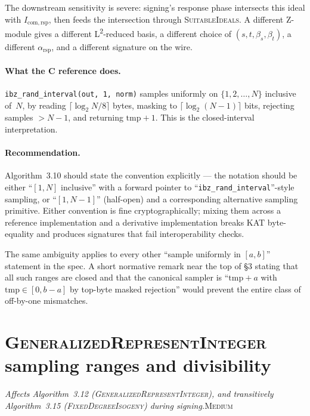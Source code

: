 \documentclass[a4paper,11pt]{article}
\newcommand{\algo}[1]{Algorithm~#1}
\newcommand{\medium}{\textsc{\color{RoyalBlue}Medium}}
\newcommand{\finding}[2]{\noindent\textit{#1}\hfill#2\par\smallskip}
\begin{document}
The downstream sensitivity is severe: signing's response phase
intersects this ideal with $I_{\mathrm{com,rsp}}$, then feeds
the intersection through \textsc{SuitableIdeals}.  A different
Z-module gives a different L\textsuperscript{2}-reduced basis,
a different choice of $(s, t, \beta_s, \beta_t)$, a different
$\alpha_\mathrm{rsp}$, and a different signature on the wire.

\paragraph{What the C reference does.}
\texttt{ibz\_rand\_interval(out, 1, norm)} samples uniformly on
$\{1, 2, \ldots, N\}$ inclusive of~$N$, by reading
$\lceil \log_2 N / 8 \rceil$ bytes, masking to
$\lceil \log_2(N{-}1) \rceil$ bits, rejecting samples
$> N{-}1$, and returning $\mathrm{tmp} + 1$.  This is the
closed-interval interpretation.

\paragraph{Recommendation.}
\algo{3.10} should state the convention explicitly --- the
notation should be either ``$[1, N]$ inclusive'' with a forward
pointer to ``\texttt{ibz\_rand\_interval}''-style sampling, or
``$[1, N-1]$'' (half-open) and a corresponding alternative
sampling primitive.  Either convention is fine cryptographically;
mixing them across a reference implementation and a derivative
implementation breaks KAT byte-equality and produces signatures
that fail interoperability checks.

The same ambiguity applies to every other ``sample uniformly
in $[a, b]$'' statement in the spec.  A short normative remark
near the top of \S3 stating that all such ranges are closed and
that the canonical sampler is ``$\mathrm{tmp} + a$ with
$\mathrm{tmp} \in [0, b{-}a]$ by top-byte masked rejection''
would prevent the entire class of off-by-one mismatches.

\section{\textsc{GeneralizedRepresentInteger} sampling ranges and
  divisibility}
\label{sec:represent-integer}

\finding{Affects \algo{3.12}
(\textsc{GeneralizedRepresentInteger}), and transitively
\algo{3.15} (\textsc{FixedDegreeIsogeny}) during signing.}{\medium}
\end{document}

